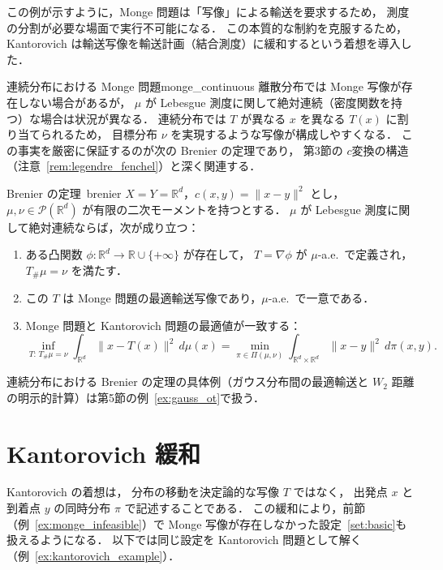 \documentclass[uplatex, dvipdfmx]{jsarticle}
\begin{document}
この例が示すように，Monge 問題は「写像」による輸送を要求するため，
測度の分割が必要な場面で実行不可能になる．
この本質的な制約を克服するため，
Kantorovich は輸送写像を輸送計画（結合測度）に緩和するという着想を導入した．

\begin{remark}{連続分布における Monge 問題}{monge_continuous}
離散分布では Monge 写像が存在しない場合があるが，
$\mu$ が Lebesgue 測度に関して絶対連続（密度関数を持つ）な場合は状況が異なる．
連続分布では $T$ が異なる $x$ を異なる $T(x)$ に割り当てられるため，
目標分布 $\nu$ を実現するような写像が構成しやすくなる．
この事実を厳密に保証するのが次の Brenier の定理であり，
第3節の $c$変換の構造（注意~\ref{rem:legendre_fenchel}）と深く関連する．
\end{remark}

\begin{theorem}{Brenier の定理~\cite{Brenier1991}}{brenier}
$X=Y=\mathbb{R}^d$，$c(x,y)=\|x-y\|^2$ とし，
$\mu,\nu\in\mathcal{P}(\mathbb{R}^d)$ が有限の二次モーメントを持つとする．
$\mu$ が Lebesgue 測度に関して絶対連続ならば，次が成り立つ：
\begin{enumerate}
  \item ある凸関数 $\phi\colon\mathbb{R}^d\to\mathbb{R}\cup\{+\infty\}$ が存在して，
        $T=\nabla\phi$ が $\mu$-a.e.\ で定義され，$T_\#\mu=\nu$ を満たす．
  \item この $T$ は Monge 問題の最適輸送写像であり，$\mu$-a.e.\ で一意である．
  \item Monge 問題と Kantorovich 問題の最適値が一致する：
        \[
          \inf_{T:\,T_\#\mu=\nu}\int_{\mathbb{R}^d}\|x-T(x)\|^2\,d\mu(x)
          = \min_{\pi\in\Pi(\mu,\nu)}\int_{\mathbb{R}^d\times\mathbb{R}^d}\|x-y\|^2\,d\pi(x,y).
        \]
\end{enumerate}
\end{theorem}

連続分布における Brenier の定理の具体例（ガウス分布間の最適輸送と
$W_2$ 距離の明示的計算）は第5節の例~\ref{ex:gauss_ot}で扱う．

\section{Kantorovich 緩和}

Kantorovich の着想は，
分布の移動を決定論的な写像 $T$ ではなく，
出発点 $x$ と到着点 $y$ の同時分布 $\pi$ で記述することである．
この緩和により，前節（例~\ref{ex:monge_infeasible}）で
Monge 写像が存在しなかった設定~\ref{set:basic}も扱えるようになる．
以下では同じ設定を Kantorovich 問題として解く（例~\ref{ex:kantorovich_example}）．
\end{document}
